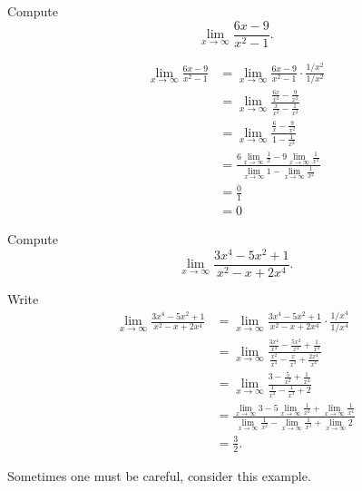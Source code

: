 \documentclass{ximera}
\begin{document}
\begin{example} Compute
\[
\lim_{x\to\infty} \frac{6x-9}{x^2-1}.
\]
\begin{explanation}
\begin{align*}
\lim_{x\to\infty}\frac{6x-9}{x^2-1} &= \lim_{x\to\infty}\frac{6x-9}{x^2-1}\cdot \frac{1/x^2}{1/x^2}\\
&=\lim_{x\to\infty}\frac{\frac{6x}{x^2} - \frac{9}{x^2}}{\frac{x}{x^2} - \frac{1}{x^2}}\\
&= \lim_{x\to\infty} \frac{\frac{6}{x}-\frac{9}{x^2}}{1-\frac{1}{x^2}}\\
&=\frac{6 \displaystyle\lim_{x\to\infty} \frac{1}{x} - 9 \displaystyle\lim_{x\to\infty} \frac{1}{x^2}}{\displaystyle\lim_{x\to\infty} 1 - \displaystyle\lim_{x\to\infty} \frac{1}{x^2}} \\
&= \frac{0}{1} \\
&= 0
\end{align*}
\end{explanation}
\end{example}

\begin{example} Compute
\[
\lim_{x\to\infty} \frac{3x^4-5x^2+1}{x^2-x+2x^4}.
\]
\begin{explanation}
Write
\begin{align*}
\lim_{x\to\infty}\frac{3x^4-5x^2+1}{x^2-x+2x^4} &= \lim_{x\to\infty}\frac{3x^4-5x^2+1}{x^2-x+2x^4}\cdot \frac{1/x^4}{1/x^4}\\
&=\lim_{x\to\infty}\frac{\frac{3x^4}{x^4} - \frac{5x^2}{x^4}+\frac{1}{x^4}}{\frac{x^2}{x^4}-\frac{x}{x^4} + \frac{2x^4}{x^4}}\\
&= \lim_{x\to\infty} \frac{3-\frac{5}{x^2}+\frac{1}{x^4}}{\frac{1}{x^2}-\frac{1}{x^3}+2}\\
&= \frac{\displaystyle\lim_{x\to\infty} 3 - 5 \displaystyle\lim_{x\to\infty} \frac{1}{x^2} + \displaystyle\lim_{x\to\infty} \frac{1}{x^4}}{\displaystyle\lim_{x\to\infty} \frac{1}{x^2} - \displaystyle\lim_{x\to\infty} \frac{1}{x^3} + \displaystyle\lim_{x\to\infty} 2} \\
&= \frac{3}{2}.
\end{align*}
\end{explanation}
\end{example}

Sometimes one must be careful, consider this example.
\end{document}
